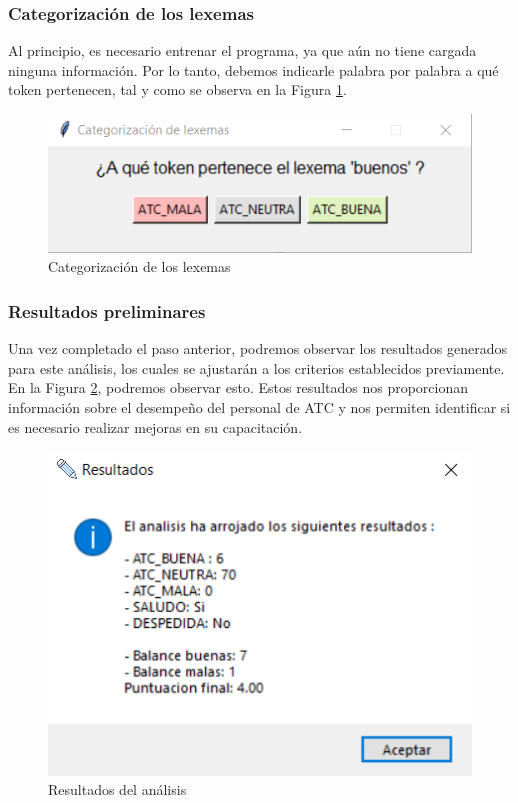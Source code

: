 \documentclass[10pt,times,twocolumn]{article}
\begin{document}
\subsubsection{Categorización de los lexemas}
Al principio, es necesario entrenar el programa, ya que aún no tiene cargada ninguna información. Por lo tanto, debemos indicarle palabra por palabra a qué token pertenecen, tal y como se observa en la Figura \ref{fig:graf_atc_paso3}.

\begin{figure}[H]
    \centering
    \includegraphics[width=\linewidth]{fig/ATC_paso3.png}
    \caption{Categorización de los lexemas}
    \label{fig:graf_atc_paso3}
\end{figure}

\subsubsection{Resultados preliminares}
Una vez completado el paso anterior, podremos observar los resultados generados para este análisis, los cuales se ajustarán a los criterios establecidos previamente. En la Figura \ref{fig:graf_atc_paso4}, podremos observar esto. Estos resultados nos proporcionan información sobre el desempeño del personal de ATC y nos permiten identificar si es necesario realizar mejoras en su capacitación.

\begin{figure}[H]
    \centering
    \includegraphics[width=0.9\linewidth]{fig/ATC_paso4.png}
    \caption{Resultados del análisis}
    \label{fig:graf_atc_paso4}
\end{figure}
\end{document}

